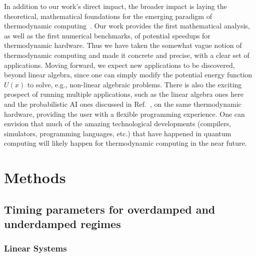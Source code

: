 \documentclass[prx,onecolumn,floatfix,longbibliography,notitlepage, nofootinbib,12pt]{revtex4-2}
\begin{document}
In addition to our work's direct impact, the broader impact is laying the theoretical, mathematical foundations for the emerging paradigm of thermodynamic computing~\cite{conte2019thermodynamic}. Our work provides the first mathematical analysis, as well as the first numerical benchmarks, of potential speedups for thermodynamic hardware. Thus we have taken the somewhat vague notion of thermodynamic computing and made it concrete and precise, with a clear set of applications. Moving forward, we expect new applications to be discovered, beyond linear algebra, since one can simply modify the potential energy function $U(x)$ to solve, e.g., non-linear algebraic problems. There is also the exciting prospect of running multiple applications, such as the linear algebra ones here and the probabilistic AI ones discussed in Ref.~\cite{coles2023thermodynamic}, on the same thermodynamic hardware, providing the user with a flexible programming experience. One can envision that much of the amazing technological developments (compilers, simulators, programming languages, etc.) that have happened in quantum computing will likely happen for thermodynamic computing in the near future.











\section{Methods}

\subsection{Timing parameters for overdamped and underdamped regimes}

\subsubsection{Linear Systems}
\end{document}
